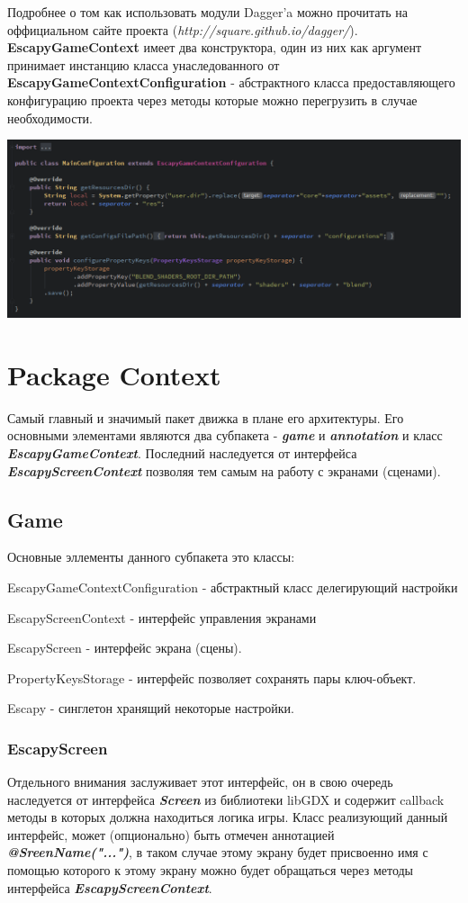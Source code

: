 \documentclass[11pt]{report}
\newenvironment{itemize*}%
  {\begin{itemize}%
    \setlength{\itemsep}{2pt}%
    \setlength{\parskip}{0.75pt}}%
  {\end{itemize}}
\begin{document}
Подробнее о том как использовать модули Dagger'a можно прочитать на оффициальном  сайте проекта (\textit{http://square.github.io/dagger/}). \textbf{EscapyGameContext} имеет два конструктора, один из них как аргумент принимает инстанцию класса унаследованного от
\textbf{EscapyGameContextConfiguration} - абстрактного класса предоставляющего конфигурацию проекта через методы которые можно перегрузить в случае необходимости.
\begin{center}
	\includegraphics[width=1.2\linewidth]{img/4.png} 
  	\label{img:4} 
\end{center}


\chapter{Package Context}
Самый главный и значимый пакет движка в плане его архитектуры. Его основными элементами
являются два субпакета - \textit{\textbf{game}} и \textit{\textbf{annotation}} и класс
\textit{\textbf{EscapyGameContext}}. Последний наследуется от интерфейса \textit{\textbf{EscapyScreenContext}} позволяя тем самым на работу с экранами (сценами).

\section{Game}
Основные эллементы данного субпакета это классы: \begin{itemize*}
\item EscapyGameContextConfiguration - абстрактный класс делегирующий настройки
\item EscapyScreenContext - интерфейс управления экранами
\item EscapyScreen - интерфейс экрана (сцены).
\item PropertyKeysStorage - интерфейс позволяет сохранять пары ключ-объект.
\item Escapy - синглетон хранящий некоторые настройки.
\end{itemize*}
\subsection*{EscapyScreen}
Отдельного внимания заслуживает этот интерфейс, он в свою очередь наследуется от интерфейса \textit{\textbf{Screen}} из библиотеки libGDX и содержит callback методы в которых должна находиться логика игры. Класс реализующий данный интерфейс, может (опционально) быть отмечен аннотацией \textit{\textbf{@SreenName("...")}}, в таком случае этому экрану будет присвоенно имя с помощью которого к этому экрану можно будет обращаться через методы интерфейса \textit{\textbf{EscapyScreenContext}}.
\end{document}
